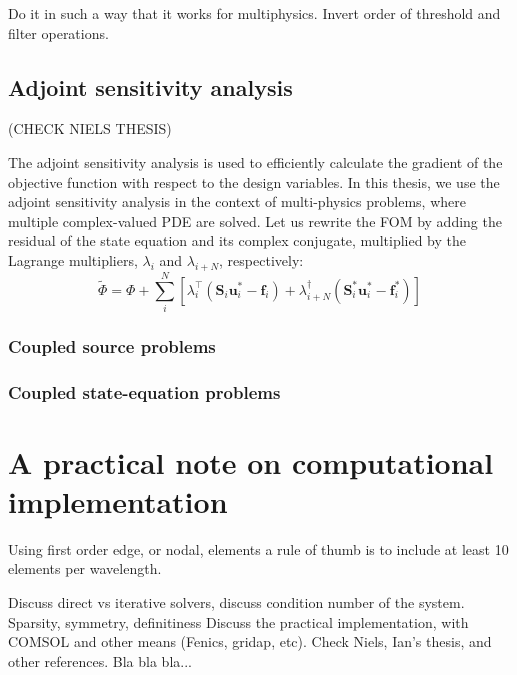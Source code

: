Do it in such a way that it works for multiphysics.
Invert order of threshold and filter operations.

\subsection{Adjoint sensitivity analysis}

(CHECK NIELS THESIS)

The adjoint sensitivity analysis is used to efficiently calculate the gradient of the objective function with 
respect to the design variables. In this thesis, we use the adjoint sensitivity analysis  in the context of 
multi-physics problems, where multiple complex-valued PDE are solved. Let us rewrite the FOM by adding the residual
of the state equation and its complex conjugate, multiplied by the Lagrange multipliers, $\lambda_i$ and $\lambda_{i+N}$, 
respectively:
\begin{equation}
    \tilde{\Phi} =\Phi + \sum^N_i \left[ \lambda_{i}^{\top}\left(\mathbf{S}_i \mathbf{u}^*_i -\mathbf{f}_i\right) + 
    \lambda_{i+N}^{\dagger}\left(\mathbf{S}_{i}^* \mathbf{u}^*_i -\mathbf{f}_i^*\right) \right]
\end{equation}

\subsubsection*{Coupled source problems}

\subsubsection*{Coupled state-equation problems}


\section{A practical note on computational implementation}

Using first order edge, or nodal, elements a rule of thumb is to include at least 10 elements per wavelength.

Discuss direct vs iterative solvers, discuss condition number of the system.
Sparsity, symmetry, definitiness
Discuss the practical implementation, with COMSOL and other means (Fenics, gridap, etc).
Check Niels, Ian's thesis, and other references.
Bla bla bla...